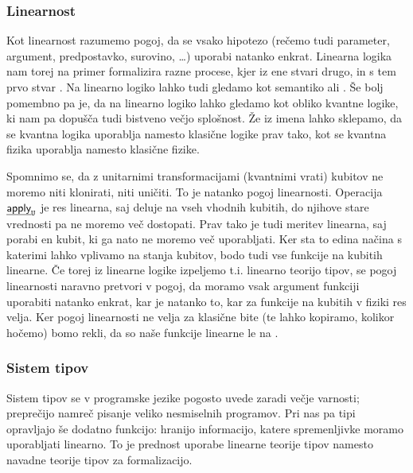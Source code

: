 \subsubsection{Linearnost}
Kot linearnost razumemo pogoj, da se vsako hipotezo (rečemo tudi parameter, argument, predpostavko, surovino, …) uporabi natanko enkrat.
Linearna logika nam torej na primer formalizira razne procese, kjer iz ene stvari  drugo, in s tem prvo stvar .
Na linearno logiko lahko tudi gledamo kot semantiko  ali .
Še bolj pomembno pa je, da na linearno logiko lahko gledamo kot  obliko kvantne logike,
ki nam pa dopušča tudi bistveno večjo splošnost.
Že iz imena lahko sklepamo, da se kvantna logika uporablja namesto klasične logike prav tako, kot se kvantna fizika uporablja namesto klasične fizike.

Spomnimo se, da z unitarnimi transformacijami (kvantnimi vrati) kubitov ne moremo niti klonirati, niti uničiti.
To je natanko pogoj linearnosti.
Operacija \(\eff{apply}_{\g U}\) je res linearna, saj deluje na vseh vhodnih kubitih, do njihove stare vrednosti pa ne moremo več dostopati.
Prav tako je tudi meritev linearna, saj porabi en kubit, ki ga nato ne moremo več uporabljati.
Ker sta to edina načina s katerimi lahko vplivamo na stanja kubitov, bodo tudi vse funkcije na kubitih linearne.
Če torej iz linearne logike izpeljemo t.i. linearno teorijo tipov, se pogoj linearnosti naravno pretvori v pogoj, da moramo vsak argument funkciji uporabiti natanko enkrat, kar je natanko to, kar za funkcije na kubitih v fiziki res velja.
Ker pogoj linearnosti ne velja za klasične bite (te lahko kopiramo, kolikor hočemo) bomo rekli, da so naše funkcije linearne le na .


\subsubsection{Sistem tipov}
Sistem tipov se v programske jezike pogosto uvede zaradi večje varnosti;
preprečijo namreč pisanje veliko nesmiselnih programov.
Pri nas pa tipi opravljajo še dodatno funkcijo:
hranijo informacijo, katere spremenljivke moramo uporabljati linearno.
To je prednost uporabe linearne teorije tipov namesto navadne teorije tipov za formalizacijo.

